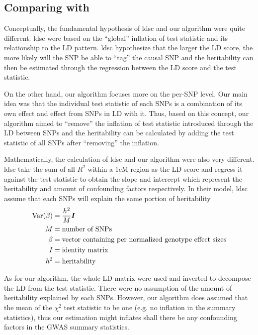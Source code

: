 		\subsection{Comparing with }
			Conceptually, the fundamental hypothesis of \gls{ldsc} and our algorithm were quite different.
			\gls{ldsc} were based on the ``global'' inflation of test statistic and its relationship to the \gls{LD} pattern.
			\gls{ldsc} hypothesize that the larger the \gls{LD} score, the more likely will the \gls{SNP} be able to ``tag'' the causal \gls{SNP} and the heritability can then be estimated through the regression between the \gls{LD} score and the test statistic.
			
			On the other hand, our algorithm focuses more on the per-\gls{SNP} level.
			Our main idea was that the individual test statistic of each \glspl{SNP} is a combination of its own effect and effect from \glspl{SNP} in \gls{LD} with it. 
			Thus, based on this concept, our algorithm aimed to ``remove'' the inflation of test statistic introduced through the \gls{LD} between \glspl{SNP} and the heritability can be calculated by adding the test statistic of all \glspl{SNP} after ``removing'' the inflation. 
			
			Mathematically, the calculation of \gls{ldsc} and our algorithm were also very different. 
			\gls{ldsc} take the sum of all $R^2$ within a 1cM region as the LD score and regress it against the test statistic to obtain the slope and intercept which represent the heritability and amount of confounding factors respectively. 
			In their model, \gls{ldsc} assume that each \glspl{SNP} will explain the same portion of heritability
			\begin{align}
			 \mathrm{Var}(\beta)&=\frac{h^2}{M}\boldsymbol{I}\\
			 M &= \text{number of SNPs}\notag\\
			 \beta &= \text{vector containing per normalized genotype effect sizes}\notag\\
			 I &= \text{identity matrix}\notag\\
			 h^2 &= \text{heritability}\notag
			\end{align}
			
			As for our algorithm, the whole \gls{LD} matrix were used and inverted to decompose the \gls{LD} from the test statistic. 
			There were no assumption of the amount of heritability explained by each \glspl{SNP}. 
			However, our algorithm does assumed that the mean of the $\chi^2$ test statistic to be one (e.g. no inflation in the summary statistics), thus our estimation might inflates shall there be any confounding factors in the \gls{GWAS} summary statistics.
			
